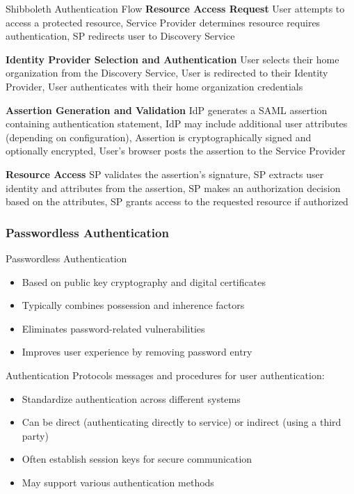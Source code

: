 \begin{KR}{Shibboleth Authentication Flow}
\textbf{Resource Access Request}
User attempts to access a protected resource, Service Provider determines resource requires authentication,
SP redirects user to Discovery Service 

\textbf{Identity Provider Selection and Authentication}
User selects their home organization from the Discovery Service, 
User is redirected to their Identity Provider,
User authenticates with their home organization credentials

\textbf{Assertion Generation and Validation}
IdP generates a SAML assertion containing authentication statement,
IdP may include additional user attributes (depending on configuration),
Assertion is cryptographically signed and optionally encrypted,
User's browser posts the assertion to the Service Provider

\textbf{Resource Access}
SP validates the assertion's signature,
SP extracts user identity and attributes from the assertion,
SP makes an authorization decision based on the attributes,
SP grants access to the requested resource if authorized
\end{KR}
\multend


\subsubsection{Passwordless Authentication}


\begin{definition}{Passwordless Authentication}
\begin{itemize}
    \item Based on public key cryptography and digital certificates
    \item Typically combines possession and inherence factors
    \item Eliminates password-related vulnerabilities
    \item Improves user experience by removing password entry
\end{itemize}
\end{definition}

\begin{definition}{Authentication Protocols} messages and procedures for user authentication:
\begin{itemize}
    \item Standardize authentication across different systems
    \item Can be direct (authenticating directly to service) or indirect (using a third party)
    \item Often establish session keys for secure communication
    \item May support various authentication methods
\end{itemize}
\end{definition}


